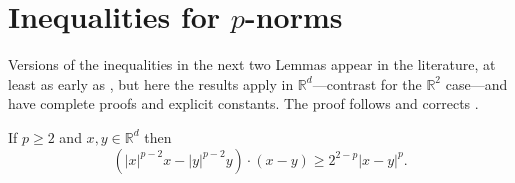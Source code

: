 \documentclass[final,onefignum]{siamart190516}
\newcommand\RR{\mathbb{R}}
\begin{document}
\appendix

\section{Inequalities for $p$-norms}   \label{app:pinequalities}  Versions of the inequalities in the next two Lemmas appear in the literature, at least as early as \cite{GlowinskiMarroco1975}, but here the results apply in $\RR^d$---contrast \cite{BarrettLiu1993,GlowinskiMarroco1975} for the $\RR^2$ case---and have complete proofs and explicit constants.  The proof follows and corrects \cite[Appendix A]{Peral1997}.

\begin{lemma}  \label{lem:pbiginequality}  If $p\ge 2$ and $x,y\in\RR^d$ then
\begin{equation}
\left(|x|^{p-2} x - |y|^{p-2} y\right)\cdot(x-y) \ge 2^{2-p} |x-y|^p. \label{eq:pbiginequality}
\end{equation}
\end{lemma}
\end{document}
